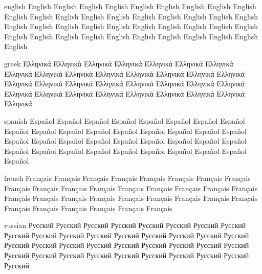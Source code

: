 \documentclass{article}
\begin{document}
\begin{otherlanguage*}{english}
English English English English English English English English English English
English English English English English English English English English English
English English English English English English English English English English
English English English English English English English English English English
\end{otherlanguage*}

\begin{otherlanguage*}{greek}
Ελληνικά Ελληνικά Ελληνικά Ελληνικά Ελληνικά Ελληνικά Ελληνικά Ελληνικά 
Ελληνικά Ελληνικά Ελληνικά Ελληνικά Ελληνικά Ελληνικά Ελληνικά Ελληνικά 
Ελληνικά Ελληνικά Ελληνικά Ελληνικά Ελληνικά Ελληνικά Ελληνικά Ελληνικά 
Ελληνικά Ελληνικά Ελληνικά Ελληνικά Ελληνικά Ελληνικά Ελληνικά Ελληνικά 
\end{otherlanguage*}

\begin{otherlanguage*}{spanish}
Español Español Español Español Español Español Español Español Español 
Español Español Español Español Español Español Español Español Español 
Español Español Español Español Español Español Español Español Español 
Español Español Español Español Español Español Español Español Español 
\end{otherlanguage*}

\begin{otherlanguage*}{french}
Français Français Français Français Français Français Français Français 
Français Français Français Français Français Français Français Français 
Français Français Français Français Français Français Français Français 
Français Français Français Français Français Français Français Français 
\end{otherlanguage*}

\begin{otherlanguage*}{russian}
Русский Русский Русский Русский Русский Русский Русский Русский Русский 
Русский Русский Русский Русский Русский Русский Русский Русский Русский 
Русский Русский Русский Русский Русский Русский Русский Русский Русский 
Русский Русский Русский Русский Русский Русский Русский Русский Русский 
\end{otherlanguage*}
\end{document}
